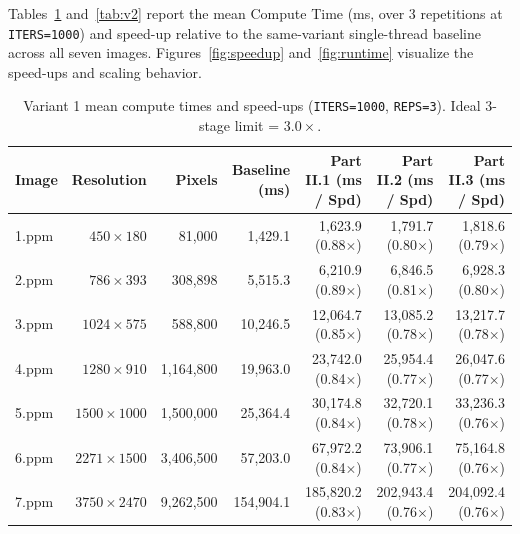 \documentclass[10pt,a4paper]{article}
\begin{document}
Tables~\ref{tab:v1} and~\ref{tab:v2} report the mean Compute Time (ms, over 3 repetitions at \texttt{ITERS=1000}) and speed-up relative to the same-variant single-thread baseline across all seven images. Figures~\ref{fig:speedup} and~\ref{fig:runtime} visualize the speed-ups and scaling behavior.

\begin{table}[h!]
\centering
\small
\setlength{\tabcolsep}{4.5pt}
\begin{tabular}{@{}lrrrrrr@{}}
\toprule
Image & Resolution & Pixels & Baseline (ms) & Part II.1 (ms / Spd) & Part II.2 (ms / Spd) & Part II.3 (ms / Spd) \\
\midrule
1.ppm & $450\times 180$ & 81,000 & 1,429.1 & 1,623.9 (0.88$\times$) & 1,791.7 (0.80$\times$) & 1,818.6 (0.79$\times$) \\
2.ppm & $786\times 393$ & 308,898 & 5,515.3 & 6,210.9 (0.89$\times$) & 6,846.5 (0.81$\times$) & 6,928.3 (0.80$\times$) \\
3.ppm & $1024\times 575$ & 588,800 & 10,246.5 & 12,064.7 (0.85$\times$) & 13,085.2 (0.78$\times$) & 13,217.7 (0.78$\times$) \\
4.ppm & $1280\times 910$ & 1,164,800 & 19,963.0 & 23,742.0 (0.84$\times$) & 25,954.4 (0.77$\times$) & 26,047.6 (0.77$\times$) \\
5.ppm & $1500\times 1000$ & 1,500,000 & 25,364.4 & 30,174.8 (0.84$\times$) & 32,720.1 (0.78$\times$) & 33,236.3 (0.76$\times$) \\
6.ppm & $2271\times 1500$ & 3,406,500 & 57,203.0 & 67,972.2 (0.84$\times$) & 73,906.1 (0.77$\times$) & 75,164.8 (0.76$\times$) \\
7.ppm & $3750\times 2470$ & 9,262,500 & 154,904.1 & 185,820.2 (0.83$\times$) & 202,943.4 (0.76$\times$) & 204,092.4 (0.76$\times$) \\
\bottomrule
\end{tabular}
\caption{Variant 1 mean compute times and speed-ups (\texttt{ITERS=1000}, \texttt{REPS=3}). Ideal 3-stage limit = $3.0\times$.}
\label{tab:v1}
\end{table}
\end{document}
